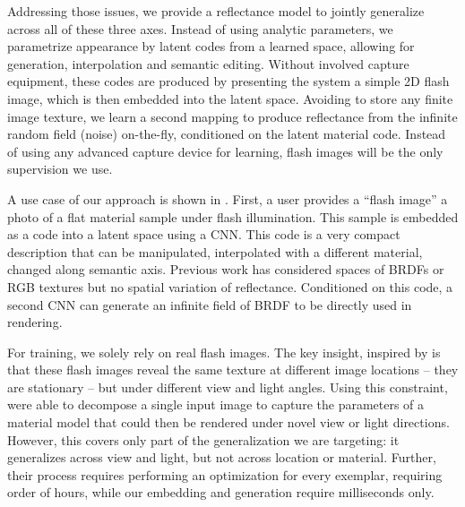 \documentclass[acmtog, review, anonymous]{acmart}
\begin{document}
Addressing those issues, we provide a reflectance model to jointly generalize across all of these three axes.
Instead of using analytic parameters, we parametrize appearance by latent codes from a learned space, allowing for generation, interpolation and semantic editing.
Without involved capture equipment, these codes are produced by presenting the system a simple 2D flash image, which is then embedded into the latent space.
Avoiding to store any finite image texture, we learn a second mapping to produce reflectance from the infinite random field (noise) on-the-fly, conditioned on the latent material code. 
Instead of using any advanced capture device for learning, flash images will be the only supervision we use.
%

A use case of our approach is shown in .
First, a user provides a ``flash image'' a photo of a flat material sample under flash illumination.
This sample is embedded as a code into a latent space using a CNN.
This code is a very compact description that can be manipulated, \eg interpolated with a different material, changed along semantic axis. 
Previous work has considered spaces of BRDFs \cite{matusik2003data} or RGB textures \cite{matusik2005texture} but no spatial variation of reflectance.
Conditioned on this code, a second CNN can generate an infinite field of BRDF to be directly used in rendering. 

For training, we solely rely on real flash images.
The key insight, inspired by \citet{aittala2016reflectance} is that these flash images reveal the same texture at different image locations -- they are stationary -- but under different view and light angles.
Using this constraint, \citet{aittala2016reflectance} were able to decompose a single input image to capture the parameters of a material model that could then be rendered under novel view or light directions.
However, this covers only part of the generalization we are targeting: it generalizes across view and light, but not across location or material. 
Further, their process requires performing an optimization for every exemplar, requiring order of hours, while our embedding and generation require milliseconds only.
\end{document}
